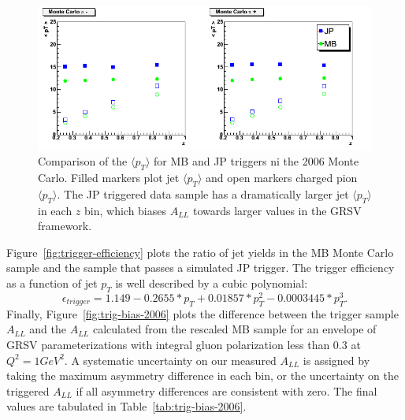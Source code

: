 \begin{figure}
  \includegraphics[width=1.0\textwidth]{figures/meanpt-by-trigger}
  \caption{Comparison of the $\langle p_T \rangle$ for MB and JP triggers ni the 2006 Monte Carlo.  Filled markers plot jet $\langle p_T \rangle$ and open markers charged pion $\langle p_T \rangle$. The JP triggered data sample has a dramatically larger jet $\langle p_T \rangle$ in each $z$ bin, which biases $A_{LL}$ towards larger values in the GRSV framework.}
  \label{fig:mean-pt-simu}
\end{figure}

Figure~\ref{fig:trigger-efficiency} plots the ratio of jet yields in the MB
Monte Carlo sample and the sample that passes a simulated JP trigger. The
trigger efficiency as a function of jet \(p_T\) is well described by a cubic
polynomial:
%
\begin{equation}
  \epsilon_{trigger} = 1.149 - 0.2655 * p_T   + 0.01857 * p_T^2 - 0.0003445 * p_T^3.
  \label{eqn:trigger-efficiency}
\end{equation}
%
Finally, Figure~\ref{fig:trig-bias-2006} plots the difference between the
trigger sample \(A_{LL}\) and the \(A_{LL}\) calculated from the rescaled MB
sample for an envelope of GRSV parameterizations with integral gluon
polarization less than 0.3 at \(Q^2 = 1 GeV^2\). A systematic uncertainty on our
measured \(A_{LL}\) is assigned by taking the maximum asymmetry difference in
each bin, or the uncertainty on the triggered \(A_{LL}\) if all asymmetry
differences are consistent with zero. The final values are tabulated in
Table~\ref{tab:trig-bias-2006}.


